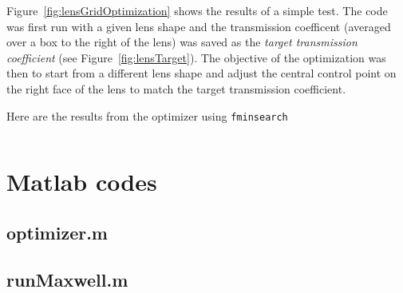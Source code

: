 \documentclass[11pt]{article}
\newcommand{\bahDir}{/Users/henshaw/DropBox/EM_Homogenization/notes}
\begin{document}
Figure~\ref{fig:lensGridOptimization} shows the results of a simple test.
The code was first run with a given lens shape and the transmission coefficent (averaged over a box to the right of the lens)
was saved as the {\em target transmission coefficient} (see Figure~\ref{fig:lensTarget}). 
The objective of the optimization was then to start from a different lens shape and adjust the
central control point on the right face of the lens to match the target transmission coefficient. 

Here are the results from the optimizer using {\tt fminsearch}
{\footnotesize
\begin{verbatim}

\end{verbatim}
}


  



\appendix
\section{Matlab codes}

\subsection{optimizer.m}


\subsection{runMaxwell.m}


\clearpage


\end{document}
